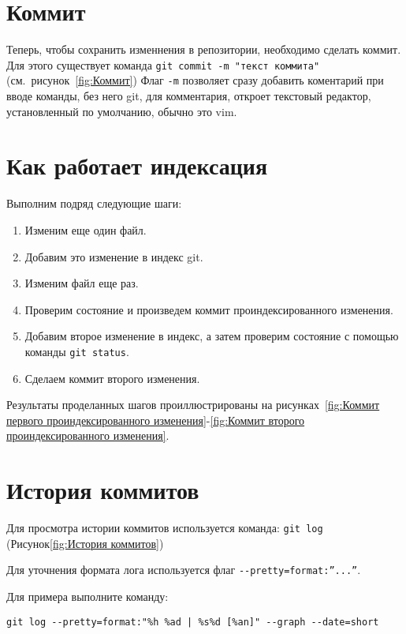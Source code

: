 \section{Коммит}

Теперь, чтобы сохранить изменнения в репозитории, необходимо сделать коммит.
Для этого существует команда \texttt{git~commit~-m~"текст~коммита"}
(см.~рисунок~\ref{fig:Коммит})
Флаг \texttt{-m} позволяет сразу добавить коментарий при вводе команды, без
него git, для комментария, откроет текстовый редактор,
установленный по умолчанию, обычно это vim.


\section{Как работает индексация}
Выполним подряд следующие шаги:
\begin{enumerate}
	\item Изменим еще один файл.
	\item Добавим это изменение в индекс git.
	\item Изменим файл еще раз.
	\item Проверим состояние и произведем коммит проиндексированного
	изменения.
	\item Добавим второе изменение в индекс,
	а затем проверим состояние с помощью команды \texttt{git~status}.
	\item Сделаем коммит второго изменения.
\end{enumerate}

Результаты проделанных шагов проиллюстрированы на
рисунках~\ref{fig:Коммит первого проиндексированного изменения}-\ref{fig:Коммит второго проиндексированного изменения}.



\section{История коммитов}
Для просмотра истории коммитов используется команда: \texttt{git~log}
(Рисунок\ref{fig:История коммитов})

Для уточнения формата лога используется флаг \verb|--pretty=format:”...”|.

Для примера выполните команду:
\begin{verbatim}
git log --pretty=format:"%h %ad | %s%d [%an]" --graph --date=short
\end{verbatim}

